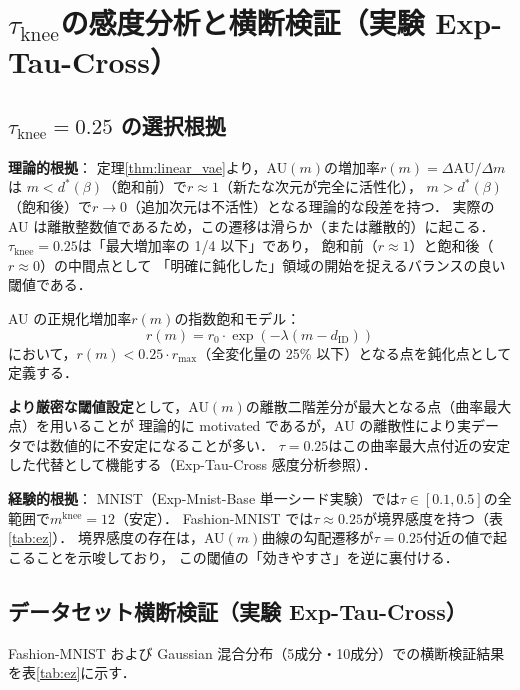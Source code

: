 \documentclass[11pt,a4paper]{jsarticle}
\newcommand{\dID}{d_{\mathrm{ID}}}
\newcommand{\mknee}{m^{\mathrm{knee}}}
\begin{document}
\section{$\tau_{\mathrm{knee}}$の感度分析と横断検証（実験 Exp-Tau-Cross）}\label{app:tau_knee}

\subsection*{$\tau_{\mathrm{knee}} = 0.25$ の選択根拠}

\textbf{理論的根拠}：
定理\ref{thm:linear_vae}より，AU$(m)$の増加率$r(m) = \Delta\mathrm{AU}/\Delta m$は
$m < d^*(\beta)$（飽和前）で$r \approx 1$（新たな次元が完全に活性化），
$m > d^*(\beta)$（飽和後）で$r \to 0$（追加次元は不活性）となる理論的な段差を持つ．
実際の AU は離散整数値であるため，この遷移は滑らか（または離散的）に起こる．
$\tau_{\mathrm{knee}} = 0.25$は「最大増加率の 1/4 以下」であり，
飽和前（$r \approx 1$）と飽和後（$r \approx 0$）の中間点として
「明確に鈍化した」領域の開始を捉えるバランスの良い閾値である．

AU の正規化増加率$r(m)$の指数飽和モデル：
\begin{equation}
  r(m) = r_0 \cdot \exp(-\lambda (m - \dID))
  \label{eq:knee_curvature}
\end{equation}
において，$r(m) < 0.25 \cdot r_{\max}$（全変化量の 25\% 以下）となる点を鈍化点として定義する．

\textbf{より厳密な閾値設定}として，AU$(m)$の離散二階差分が最大となる点（曲率最大点）を用いることが
理論的に motivated であるが，AU の離散性により実データでは数値的に不安定になることが多い．
$\tau = 0.25$はこの曲率最大点付近の安定した代替として機能する（Exp-Tau-Cross 感度分析参照）．

\textbf{経験的根拠}：
MNIST（Exp-Mnist-Base 単一シード実験）では$\tau \in [0.1, 0.5]$の全範囲で$\mknee = 12$（安定）．
Fashion-MNIST では$\tau \approx 0.25$が境界感度を持つ（表\ref{tab:ez}）．
境界感度の存在は，AU$(m)$曲線の勾配遷移が$\tau = 0.25$付近の値で起こることを示唆しており，
この閾値の「効きやすさ」を逆に裏付ける．

\subsection*{データセット横断検証（実験 Exp-Tau-Cross）}

Fashion-MNIST および Gaussian 混合分布（5成分・10成分）での横断検証結果を表\ref{tab:ez}に示す．
\end{document}
